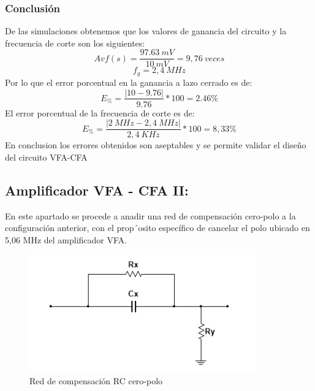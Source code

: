 \documentclass[a4paper,12pt]{article}
\begin{document}
\subsubsection{Conclusión}
\vspace{0,2cm}
\hspace{1mm}De las simulaciones obtenemos que los valores de ganancia del circuito y la frecuencia de corte son los siguientes:
\begin{equation}
    {Avf(s)=\frac{97.63~mV}{10~mV}}=9,76~veces
\end{equation}
\begin{equation}
f_g=2,4~MHz
\end{equation}
\vspace{0.2cm}
\hspace{1mm}Por lo que el error porcentual en la ganancia a lazo cerrado es de:
\begin{equation}
    E_\%=\frac{|10-9.76|}{9.76}*100=2.46\%
\end{equation}
\vspace{0,2cm}
\hspace{1mm}El error porcentual de la frecuencia de corte es de:
\begin{equation}
    E_\%=\frac{|2~MHz-2,4~MHz|}{2,4~KHz}*100=8,33\%
\end{equation}
\hspace{1mm}En conclusion los errores obtenidos son aseptables y se permite validar el diseño del circuito VFA-CFA\\
\newpage
\subsection{Amplificador VFA - CFA II:}
\vspace{0.5cm}
\hspace{1mm}En este apartado se procede a anadir una red de compensaci\'on cero-polo a la configuraci\'on anterior, con
el prop´osito espec\'ifico de cancelar el polo ubicado en 5,06 MHz del amplificador VFA.
\begin{figure}[h]
    \centering
    \includegraphics[width=0.5\linewidth]{Red_Compensacion.png}
    \caption{Red de compensaci\'on RC cero-polo}
    \label{fig:enter-label}
\end{figure}
\vspace{0.5cm}
\end{document}

